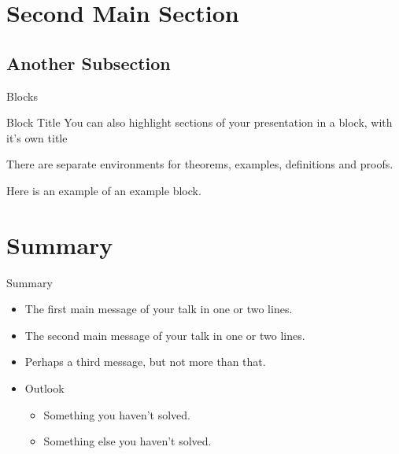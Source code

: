 \documentclass[aspectratio=169]{beamer}
\begin{document}
{\section{Second Main Section}

\subsection{Another Subsection}

\begin{frame}{Blocks}
\begin{block}{Block Title}
You can also highlight sections of your presentation in a block, with it's own title
\end{block}
\begin{theorem}
There are separate environments for theorems, examples, definitions and proofs.
\end{theorem}
\begin{example}
Here is an example of an example block.
\end{example}
\end{frame}


\section*{Summary}

\begin{frame}{Summary}
  \begin{itemize}
  \item
    The \alert{first main message} of your talk in one or two lines.
  \item
    The \alert{second main message} of your talk in one or two lines.
  \item
    Perhaps a \alert{third message}, but not more than that.
  \end{itemize}
  
  \begin{itemize}
  \item
    Outlook
    \begin{itemize}
    \item
      Something you haven't solved.
    \item
      Something else you haven't solved.
    \end{itemize}
  \end{itemize}
\end{frame}



}
\end{document}
